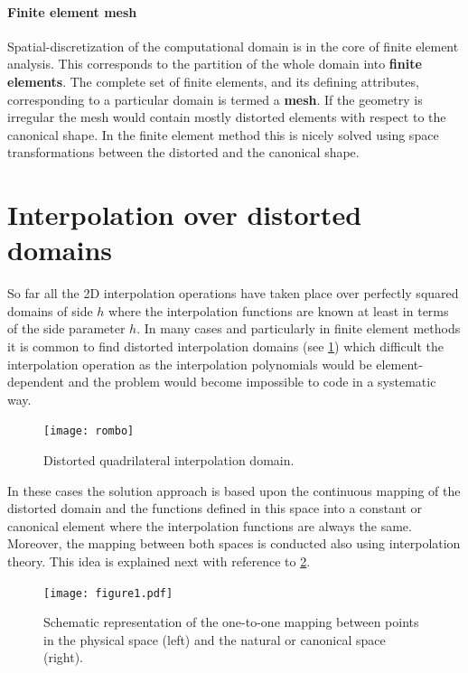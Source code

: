 \begin{tcolorbox}
\paragraph*{Finite element mesh}
Spatial-discretization of the computational domain is in the core of finite element analysis. This corresponds to the partition of the whole domain into {\bf finite elements}. The complete set of finite elements, and its defining attributes, corresponding to a particular domain is termed a {\bf mesh}. If the geometry is irregular the mesh would contain mostly distorted elements with respect to the canonical shape. In the finite element method this is nicely solved using space transformations between the distorted and the canonical shape.

\end{tcolorbox}



\section{Interpolation over distorted domains}
So far all the 2D interpolation operations have taken place over perfectly squared domains of side $h$ where the interpolation functions are known at least in terms of the side parameter $h$. In many cases and particularly in finite element methods it is common to find distorted interpolation domains (see \cref{fig:physical}) which difficult the interpolation operation as the interpolation polynomials would be element-dependent and the problem would become impossible to code in a systematic way.


\begin{figure}[h]
\centering
\texttt{[image: rombo]}
\caption{Distorted quadrilateral interpolation domain.}
\label{fig:physical}
\end{figure} 

In these cases the solution approach is based upon the continuous mapping of the distorted domain and the functions defined in this space into a constant or canonical element where the interpolation functions are always the same. Moreover, the mapping between both spaces is conducted also using interpolation theory. This idea is explained next with reference to \cref{fig:natural domain}.


\begin{figure}[h]
\centering
\texttt{[image: figure1.pdf]}
\caption{Schematic representation of the one-to-one mapping between points in the physical space (left) and the natural or canonical space (right).}
\label{fig:natural domain}
\end{figure} 

